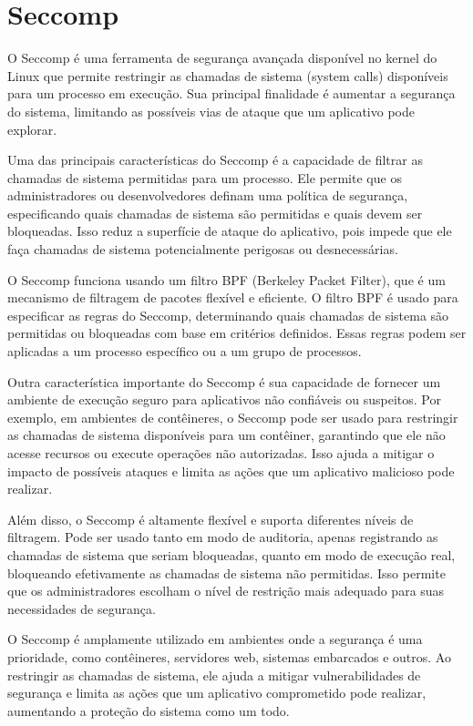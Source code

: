 \section{Seccomp}

O Seccomp é uma ferramenta de segurança avançada disponível no kernel do Linux que permite restringir as chamadas de sistema (system calls) disponíveis para um processo em execução. Sua principal finalidade é aumentar a segurança do sistema, limitando as possíveis vias de ataque que um aplicativo pode explorar.

Uma das principais características do Seccomp é a capacidade de filtrar as chamadas de sistema permitidas para um processo. Ele permite que os administradores ou desenvolvedores definam uma política de segurança, especificando quais chamadas de sistema são permitidas e quais devem ser bloqueadas. Isso reduz a superfície de ataque do aplicativo, pois impede que ele faça chamadas de sistema potencialmente perigosas ou desnecessárias.

O Seccomp funciona usando um filtro BPF (Berkeley Packet Filter), que é um mecanismo de filtragem de pacotes flexível e eficiente. O filtro BPF é usado para especificar as regras do Seccomp, determinando quais chamadas de sistema são permitidas ou bloqueadas com base em critérios definidos. Essas regras podem ser aplicadas a um processo específico ou a um grupo de processos.

Outra característica importante do Seccomp é sua capacidade de fornecer um ambiente de execução seguro para aplicativos não confiáveis ou suspeitos. Por exemplo, em ambientes de contêineres, o Seccomp pode ser usado para restringir as chamadas de sistema disponíveis para um contêiner, garantindo que ele não acesse recursos ou execute operações não autorizadas. Isso ajuda a mitigar o impacto de possíveis ataques e limita as ações que um aplicativo malicioso pode realizar.

Além disso, o Seccomp é altamente flexível e suporta diferentes níveis de filtragem. Pode ser usado tanto em modo de auditoria, apenas registrando as chamadas de sistema que seriam bloqueadas, quanto em modo de execução real, bloqueando efetivamente as chamadas de sistema não permitidas. Isso permite que os administradores escolham o nível de restrição mais adequado para suas necessidades de segurança.

O Seccomp é amplamente utilizado em ambientes onde a segurança é uma prioridade, como contêineres, servidores web, sistemas embarcados e outros. Ao restringir as chamadas de sistema, ele ajuda a mitigar vulnerabilidades de segurança e limita as ações que um aplicativo comprometido pode realizar, aumentando a proteção do sistema como um todo.